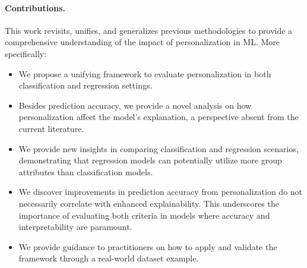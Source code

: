 \paragraph{Contributions.} This work revisits, unifies, and generalizes previous methodologies to provide a comprehensive understanding of the impact of personalization in ML. More specifically:
\begin{itemize}[leftmargin=*] 
    \setlength\itemsep{0em}
    \setlength\parskip{0em} 
    \item We propose a unifying framework to evaluate personalization in both classification and regression settings.
    \item Besides prediction accuracy, we provide a novel analysis on how personalization affect the model's explanation, a perspective absent from the current literature.   
    \item We provide new insights in comparing classification and regression scenarios, demonstrating that regression models can potentially utilize more group attributes than classification models. 
    \item We discover improvements in prediction accuracy from personalization do not necessarily correlate with enhanced explainability. This underscores the importance of evaluating both criteria in models where accuracy and interpretability are paramount.
    \item We provide guidance to practitioners on how to apply and validate the framework through a real-world dataset example.
\end{itemize}